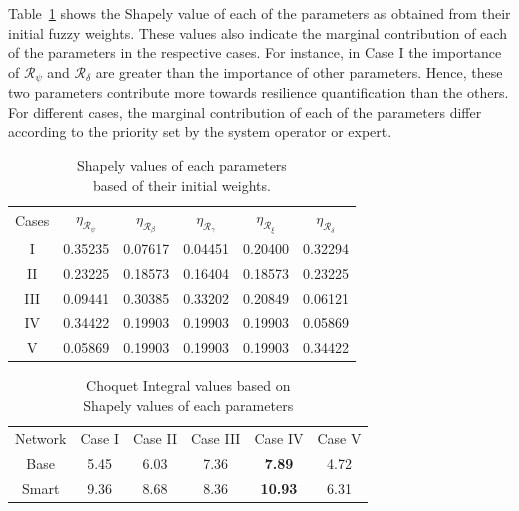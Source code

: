 \documentclass[hidelinks, 12pt]{article}
\begin{document}
Table~\ref{tab:shapely} shows the Shapely value of each of the parameters as obtained from their initial fuzzy weights. These values also indicate the marginal contribution of each of the parameters in the respective cases. For instance, in Case I the importance of $\mathcal{R}_\psi$ and $\mathcal{R}_\delta$ are greater than the importance of other parameters. Hence, these two parameters contribute more towards resilience quantification than the others. For different cases, the marginal contribution of each of the parameters differ according to the priority set by the system operator or expert.


\begin{table}[h]
    \centering
    \caption{Shapely values of each parameters \\ based of their initial weights.}
    \begin{tabular}{c|c|c|c|c|c}
    \hline
          Cases & $\eta_{\mathcal{R}_\psi}$ & $\eta_{\mathcal{R}_\beta}$ & $\eta_{\mathcal{R}_\gamma}$ & $\eta_{\mathcal{R}_\xi}$ & $\eta_{\mathcal{R}_\delta}$  \\
    \hhline{======}
         I & 0.35235 & 0.07617 & 0.04451 & 0.20400 & 0.32294 \\
    \hline
         II & 0.23225 & 0.18573 & 0.16404 & 0.18573 & 0.23225 \\ 
    \hline
         III & 0.09441 & 0.30385 & 0.33202 & 0.20849 & 0.06121 \\ 
    \hline
         IV & 0.34422 & 0.19903 & 0.19903 & 0.19903 & 0.05869 \\ 
    \hline
         V & 0.05869 & 0.19903 & 0.19903 & 0.19903 & 0.34422\\
    \hline
    \end{tabular}
    \label{tab:shapely}
\end{table}

\begin{table}[h]
    \centering
    \caption{Choquet Integral values based on \\ Shapely values of each parameters}
    \begin{tabular}{c|c|c|c|c|c}
        Network & Case I    &   Case II   & Case III & Case IV & Case V  \\
    \hhline{======}
        Base  & 5.45 & 6.03 & 7.36 & \textbf{7.89} & 4.72 \\
    \hline
        Smart & 9.36 & 8.68 & 8.36 & \textbf{10.93} & 6.31 \\ 
    \hline
    \end{tabular}
    \label{tab:CI_resilience}
\end{table}
\end{document}
